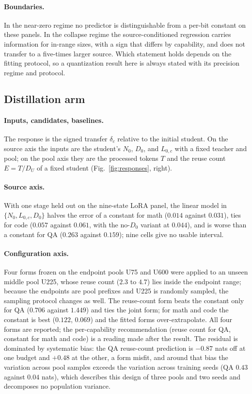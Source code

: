 \paragraph{Boundaries.} In the near-zero regime no predictor is
distinguishable from a per-bit constant on these panels. In the
collapse regime the source-conditioned regression carries information
for in-range sizes, with a sign that differs by capability, and does
not transfer to a five-times larger source. Which statement holds
depends on the fitting protocol, so a quantization result here is
always stated with its precision regime and protocol.

\subsection{Distillation arm}
\label{sec:distill}

\paragraph{Inputs, candidates, baselines.} The response is the signed
transfer $\delta_c$ relative to the initial student. On the source
axis the inputs are the student's $N_0$, $D_0$, and $L_{0,c}$ with a
fixed teacher and pool; on the pool axis they are the processed tokens
$T$ and the reuse count $E=T/D_U$ of a fixed student
(Fig.~\ref{fig:responses}, right).

\paragraph{Source axis.} With one stage held out on the nine-state
LoRA panel, the linear model in $\{N_0,L_{0,c},D_0\}$ halves the error
of a constant for math ($0.014$ against $0.031$), ties for code
($0.057$ against $0.061$, with the no-$D_0$ variant at $0.044$), and is
worse than a constant for QA ($0.263$ against $0.159$); nine cells give
no usable interval.

\paragraph{Configuration axis.} Four forms frozen on the endpoint
pools U75 and U600 were applied to an unseen middle pool U225, whose
reuse count ($2.3$ to $4.7$) lies inside the endpoint range; because
the endpoints are pool prefixes and U225 is randomly sampled, the
sampling protocol changes as well. The reuse-count form beats the
constant only for QA ($0.706$ against $1.449$) and ties the joint form;
for math and code the constant is best ($0.122$, $0.069$) and the
fitted forms over-extrapolate. All four forms are reported; the
per-capability recommendation (reuse count for QA, constant for math
and code) is a reading made after the result. The residual is
dominated by systematic bias: the QA reuse-count prediction is $-0.87$
nats off at one budget and $+0.48$ at the other, a form misfit, and
around that bias the variation across pool samples exceeds the
variation across training seeds (QA $0.43$ against $0.04$ nats), which
describes this design of three pools and two seeds and decomposes no
population variance.

